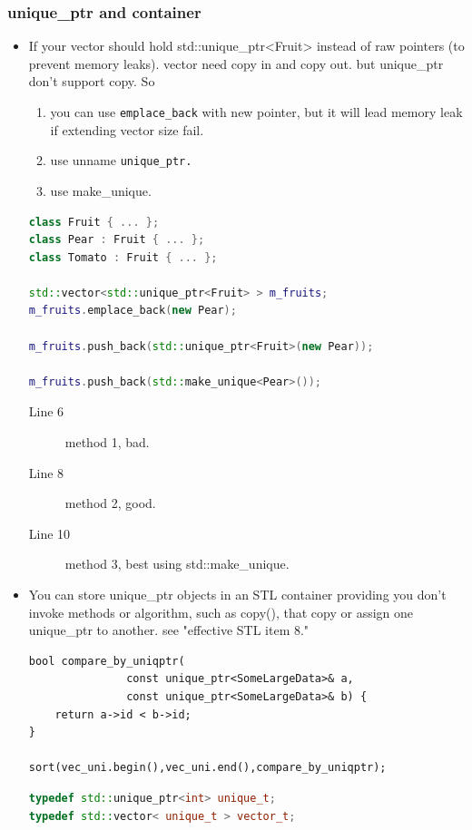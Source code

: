 \documentclass[a4paper,11pt,twoside]{book}
\begin{document}
\subsubsection{unique\_ptr and container}
\begin{itemize}

\item If your vector should hold std::unique\_ptr<Fruit> instead of raw pointers (to prevent memory leaks). vector need copy in and copy out. but unique\_ptr don't support copy. So 
\begin{enumerate}
	\item you can use \texttt{emplace\_back} with new pointer, but it will lead memory leak if extending vector size fail.
	\item use unname \texttt{unique\_ptr.}
	\item use make\_unique.
\end{enumerate}
\begin{lstlisting}[frame=single, language=c++]
class Fruit { ... };
class Pear : Fruit { ... };
class Tomato : Fruit { ... };

std::vector<std::unique_ptr<Fruit> > m_fruits;
m_fruits.emplace_back(new Pear);

m_fruits.push_back(std::unique_ptr<Fruit>(new Pear));

m_fruits.push_back(std::make_unique<Pear>());
\end{lstlisting}
\begin{description}
	\item[Line 6] method 1, bad.
	\item[Line 8] method 2, good.
	\item[Line 10] method 3, best using std::make\_unique.
\end{description}

\item You can store unique\_ptr objects in an STL container providing you don't invoke methods or algorithm, such as copy(), that copy or assign one unique\_ptr to another.  see "effective STL item 8."

\begin{lstlisting}[numbers=none]
bool compare_by_uniqptr(
               const unique_ptr<SomeLargeData>& a,
               const unique_ptr<SomeLargeData>& b) {
    return a->id < b->id;
}

sort(vec_uni.begin(),vec_uni.end(),compare_by_uniqptr);
\end{lstlisting}


\begin{lstlisting}[frame=single, language=c++]
typedef std::unique_ptr<int> unique_t;
typedef std::vector< unique_t > vector_t;


\end{lstlisting}
\end{itemize}
\end{document}
